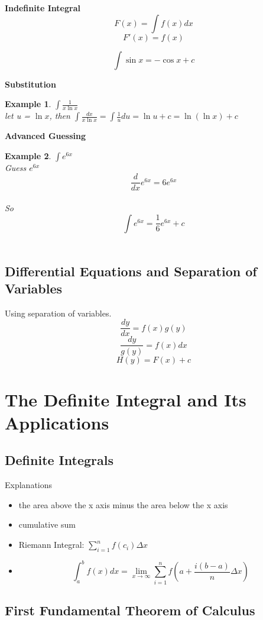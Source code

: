 \documentclass{article}
\newtheorem{exmp}{Example}
\begin{document}
\textbf{Indefinite Integral}
$$F(x) = \int f(x)dx$$
$$F'(x) = f(x)$$

$$\int \sin x = -\cos x + c$$

\textbf{Substitution}

\begin{exmp}
  $\int \frac{1}{x\ln x}$ \\
  let u = $\ln x$, then $\int \frac{dx}{x\ln x} = \int \frac{1}{u}du = \ln u + c = \ln (\ln x) + c$
\end{exmp}

\textbf{Advanced Guessing}

\begin{exmp}
  $\int e^{6x}$ \\
  Guess $e^{6x}$ \\
  $$\frac{d}{dx}e^{6x} = 6e^{6x}$$ \\
  So $$\int e^{6x} = \frac{1}{6}e^{6x} + c$$ \\
\end{exmp}

\subsection{Differential Equations and Separation of Variables}

Using separation of variables.
$$\frac{dy}{dx} = f(x)g(y)$$
$$\frac{dy}{g(y)} = f(x)dx$$
$$H(y) = F(x) + c$$

\section{The Definite Integral and Its Applications}
\subsection{Definite Integrals}

Explanations
\begin{itemize}
  \item the area above the x axis minus the area below the x axis
  \item cumulative sum
  \item Riemann Integral: $\sum\limits_{i=1}^{n}f(c_i)\Delta x$
  \item $$\int_a^bf(x)dx = \lim_{x \rightarrow \infty} \sum_{i=1}^n f(a+\frac{i(b-a)}{n}\Delta x)$$
\end{itemize}

\subsection{First Fundamental Theorem of Calculus}
\end{document}
